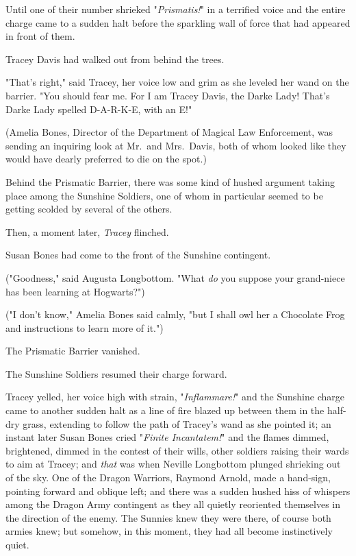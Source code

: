 Until one of their number shrieked "\emph{Prismatis!}" in a terrified voice and 
the entire charge came to a sudden halt before the sparkling wall of force that 
had appeared in front of them.

Tracey Davis had walked out from behind the trees.

"That's right," said Tracey, her voice low and grim as she leveled her wand on 
the barrier. "You should fear me. For I am Tracey Davis, the Darke Lady! That's 
Darke Lady spelled D-A-R-K-E, with an E!"

(Amelia Bones, Director of the Department of Magical Law Enforcement, was 
sending an inquiring look at Mr.~and Mrs.~Davis, both of whom looked like they 
would have dearly preferred to die on the spot.)

Behind the Prismatic Barrier, there was some kind of hushed argument taking 
place among the Sunshine Soldiers, one of whom in particular seemed to be 
getting scolded by several of the others.

Then, a moment later, \emph{Tracey} flinched.

Susan Bones had come to the front of the Sunshine contingent.

("Goodness," said Augusta Longbottom. "What \emph{do} you suppose your 
grand-niece has been learning at Hogwarts?")

("I don't know," Amelia Bones said calmly, "but I shall owl her a Chocolate 
Frog and instructions to learn more of it.")

The Prismatic Barrier vanished.

The Sunshine Soldiers resumed their charge forward.

Tracey yelled, her voice high with strain, "\emph{Inflammare!}" and the 
Sunshine charge came to another sudden halt as a line of fire blazed up between 
them in the half-dry grass, extending to follow the path of Tracey's wand as 
she pointed it; an instant later Susan Bones cried "\emph{Finite Incantatem!}" 
and the flames dimmed, brightened, dimmed in the contest of their wills, other 
soldiers raising their wards to aim at Tracey; and \emph{that} was when Neville 
Longbottom plunged shrieking out of the sky.
\sbreak
One of the Dragon Warriors, Raymond Arnold, made a hand-sign, pointing forward 
and oblique left; and there was a sudden hushed hiss of whispers among the 
Dragon Army contingent as they all quietly reoriented themselves in the 
direction of the enemy. The Sunnies knew they were there, of course both armies 
knew; but somehow, in this moment, they had all become instinctively quiet.

